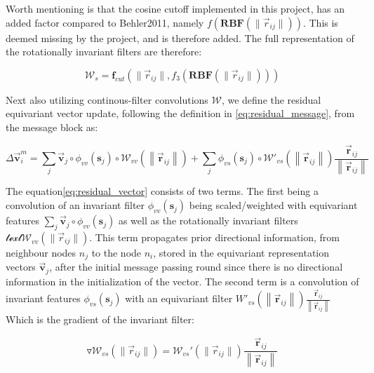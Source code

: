 Worth mentioning is that the cosine cutoff implemented in this project, has an added factor compared to Behler2011\cite{Behler2011}, namely
$f(\mathbf{RBF}(\lVert \vec{r}_{ij} \rVert))$. This is deemed missing by the project, and is therefore added. The full representation of
the rotationally invariant filters are therefore:

\begin{equation}
    \mathcal{W}_{s} = \mathbf{f}_{cut}(\lVert \vec{r}_{ij} \rVert, f_{3}(\mathbf{RBF}(\lVert \vec{r}_{ij} \rVert)))
\end{equation}

Next also utilizing continous-filter convolutions $\mathcal{W}$, we define the residual equivariant vector update,
following the definition in \ref{eq:residual_message}, from the message block as:

\begin{equation}\label{eq:residual_vector}
    \Delta \vec{\mathbf{v}}_{i}^{m}= \sum_{j} \vec{\mathbf{v}}_{j} \circ \phi_{vv}(\mathbf{s}_{j}) \circ \mathcal{W}_{vv} \left ( \left \| \vec{\mathbf{r}}_{ij} \right \| \right ) + \sum_{j} \phi_{vs}(\mathbf{s}_{j}) \circ \mathcal{W}'_{vs} \left ( \left \| \vec{\mathbf{r}}_{ij} \right \| \right ) \frac{\vec{\mathbf{r}}_{ij}}{\left \|\vec{\mathbf{r}}_{ij} \right \|}
\end{equation}

The equation\ref{eq:residual_vector} consists of two terms. The first being a convolution of an invariant filter $\phi_{vv}(\mathbf{s}_{j})$
being scaled/weighted with equivariant features $\sum_{j} \vec{\mathbf{v}}_{j} \circ \phi_{vv}(\mathbf{s}_{j})$\cite{PAINN} as well as
the rotationally invariant filters $\mathcal{text{W}}_{vv}(\lVert \vec{r}_{ij} \rVert)$. This term propagates prior directional information,
from neighbour nodes $n_{j}$ to the node $n_{i}$, stored in the equivariant representation vectors $\vec{\mathbf{v}}_{j}$,
after the initial message passing round since there is no
directional information in the initialization of the vector.
The second term is a convolution of invariant features $\phi_{vs}(\mathbf{s}_{j})$
with an equivariant filter ${W}'_{vs} \left ( \left \| \vec{\mathbf{r}}_{ij} \right \| \right ) \frac{\vec{\mathbf{r}}_{ij}}{\left \|\vec{\mathbf{r}}_{ij} \right \|}$
Which is the gradient of the invariant filter:

\begin{equation}
    \triangledown \mathcal{W}_{vs}(\lVert \vec{r}_{ij} \rVert) =  \mathcal{W}_{vs}'(\lVert \vec{r}_{ij} \rVert) \frac{\vec{\mathbf{r}}_{ij}}{\left \|\vec{\mathbf{r}}_{ij} \right \|}
\end{equation}

